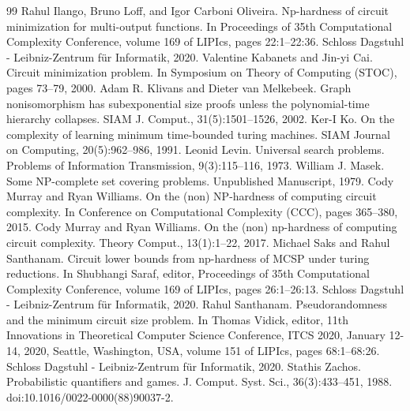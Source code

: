 \begin{thebibliography}{99}
 Rahul Ilango, Bruno Loff, and Igor Carboni Oliveira. Np-hardness of circuit minimization for multi-output functions. In Proceedings of 35th Computational Complexity Conference, volume 169 of LIPIcs, pages 22:1–22:36. Schloss Dagstuhl - Leibniz-Zentrum für Informatik, 2020.
 Valentine Kabanets and Jin-yi Cai. Circuit minimization problem. In Symposium on Theory of Computing (STOC), pages 73–79, 2000.
 Adam R. Klivans and Dieter van Melkebeek. Graph nonisomorphism has subexponential size proofs unless the polynomial-time hierarchy collapses. SIAM J. Comput., 31(5):1501–1526, 2002.
 Ker-I Ko. On the complexity of learning minimum time-bounded turing machines. SIAM Journal on Computing, 20(5):962–986, 1991.
 Leonid Levin. Universal search problems. Problems of Information Transmission, 9(3):115–116, 1973.
 William J. Masek. Some NP-complete set covering problems. Unpublished Manuscript, 1979.
 Cody Murray and Ryan Williams. On the (non) NP-hardness of computing circuit complexity. In Conference on Computational Complexity (CCC), pages 365–380, 2015.
 Cody Murray and Ryan Williams. On the (non) np-hardness of computing circuit complexity. Theory Comput., 13(1):1–22, 2017.
 Michael Saks and Rahul Santhanam. Circuit lower bounds from np-hardness of MCSP under turing reductions. In Shubhangi Saraf, editor, Proceedings of 35th Computational Complexity Conference, volume 169 of LIPIcs, pages 26:1–26:13. Schloss Dagstuhl - Leibniz-Zentrum für Informatik, 2020.
 Rahul Santhanam. Pseudorandomness and the minimum circuit size problem. In Thomas Vidick, editor, 11th Innovations in Theoretical Computer Science Conference, ITCS 2020, January 12-14, 2020, Seattle, Washington, USA, volume 151 of LIPIcs, pages 68:1–68:26. Schloss Dagstuhl - Leibniz-Zentrum für Informatik, 2020.
 Stathis Zachos. Probabilistic quantifiers and games. J. Comput. Syst. Sci., 36(3):433–451, 1988. doi:10.1016/0022-0000(88)90037-2.
\end{thebibliography}
